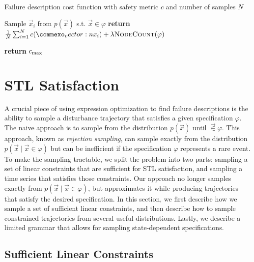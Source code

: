 \begin{algorithm}
\caption{Failure description cost function with safety metric $c$ and number of samples $N$} \label{alg:failure_description_cost_function}
\begin{algorithmic}[1]
     \label{line:fdcost_is_satisfiable}
            \State Sample $\vec{x}_i$ from $p(\vec{x})$ s.t. $\vec{x} \in \varphi$ \label{line:fdcost_sample_disturbance_trajectory}
        \EndFor
        \State \textbf{return} $\frac{1}{N} \sum_{i=1}^N  c(\vec{x}_i) + \lambda \textproc{NodeCount}(\varphi)$ \label{line:fdcost_compute_avg}
        
    \Else
        \State \textbf{return} $c_{\rm max}$ \label{line:fdcost_return_max_cost}
    \EndIf
    \EndFunction
\end{algorithmic}
\end{algorithm}


\section{STL Satisfaction}
A crucial piece of using expression optimization to find failure descriptions is the ability to sample a disturbance trajectory that satisfies a given specification $\varphi$. The naive approach is to sample from the distribution $p(\vec{x})$ until $\vec \in \varphi$. This approach, known as \emph{rejection sampling}, can sample exactly from the distribution $p(\vec{x} \mid \vec{x} \in \varphi)$ but can be inefficient if the specification $\varphi$ represents a rare event. To make the sampling tractable, we split the problem into two parts: sampling a set of linear constraints that are sufficient for STL satisfaction, and sampling a time series that satisfies those constraints. Our approach no longer samples exactly from $p(\vec{x} \mid \vec{x} \in \varphi)$, but approximates it while producing trajectories that satisfy the desired specification. In this section, we first describe how we sample a set of sufficient linear constraints, and then describe how to sample constrained trajectories from several useful distributions. Lastly, we describe a limited grammar that allows for sampling state-dependent specifications. 

\subsection{Sufficient Linear Constraints}

